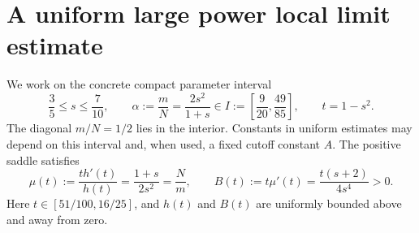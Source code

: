 \documentclass[11pt,letterpaper]{article}
\theoremstyle{remark}\newtheorem{remark}[theorem]{Remark}
\begin{document}
\section{A uniform large power local limit estimate}\label{wdn:dia:sec:LLT}
We work on the concrete compact parameter interval
\begin{equation}\label{wdn:dia:eq:interval}
 \frac35\le s\le\frac7{10},\qquad
 \alpha:=\frac mN=\frac{2s^2}{1+s}
 \in I:=\left[\frac9{20},\frac{49}{85}\right],\qquad t=1-s^2.
\end{equation}
The diagonal $m/N=1/2$ lies in the interior. Constants in uniform estimates
may depend on this interval and, when used, a fixed cutoff constant $A$.
The positive saddle satisfies
\begin{equation}\label{wdn:dia:eq:muB}
 \mu(t):=\frac{th'(t)}{h(t)}=\frac{1+s}{2s^2}=\frac Nm,
 \qquad B(t):=t\mu'(t)=\frac{t(s+2)}{4s^4}>0.
\end{equation}
Here $t\in[51/100,16/25]$, and $h(t)$ and $B(t)$ are uniformly bounded
above and away from zero.
\end{document}
